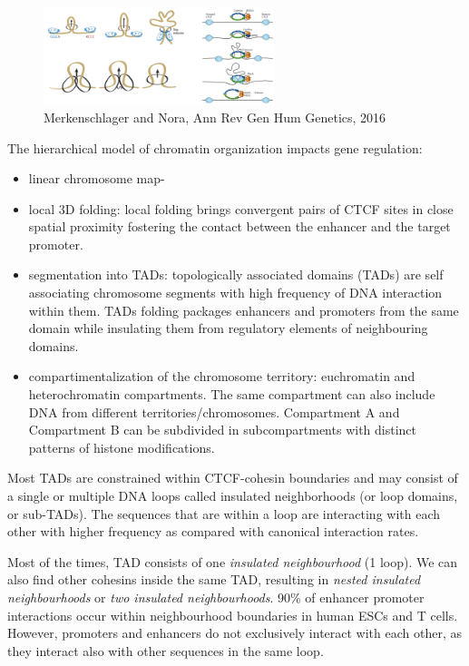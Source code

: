 \begin{figure}
\centering
\includegraphics[width=0.6\textwidth]{../_resources/Screenshot_2022-10-14_at_19-52-56.png}
\caption{Merkenschlager and Nora, Ann Rev Gen Hum Genetics, 2016}
\end{figure}

The hierarchical model of chromatin organization impacts gene regulation:
\begin{itemize}
\tightlist
\item
  linear chromosome map-
\item
  local 3D folding: local folding brings convergent pairs of CTCF sites in close spatial proximity fostering the contact between the enhancer and the target promoter.
\item
  segmentation into TADs: topologically associated domains (TADs) are self associating chromosome segments with high frequency of DNA interaction within them. TADs folding packages enhancers and promoters from the same domain while insulating them from regulatory elements of neighbouring domains.
\item
  compartimentalization of the chromosome territory: euchromatin and heterochromatin compartments. The same compartment can also include DNA from different territories/chromosomes. Compartment A and Compartment B can be subdivided in subcompartments with distinct patterns of histone modifications.
\end{itemize}

Most TADs are constrained within CTCF-cohesin boundaries and may consist of a single or multiple DNA loops called insulated neighborhoods (or loop domains, or sub-TADs). The sequences that are within a loop are interacting with each other with higher frequency as compared with canonical interaction rates.

Most of the times, TAD consists of one \emph{insulated neighbourhood} (1 loop). We can also find other cohesins inside the same TAD, resulting in \emph{nested insulated neighbourhoods} or \emph{two insulated neighbourhoods}. 90\% of enhancer promoter interactions occur within neighbourhood boundaries in human ESCs and T cells. However, promoters and enhancers do not exclusively interact with each other, as they interact also with other sequences in the same loop.

